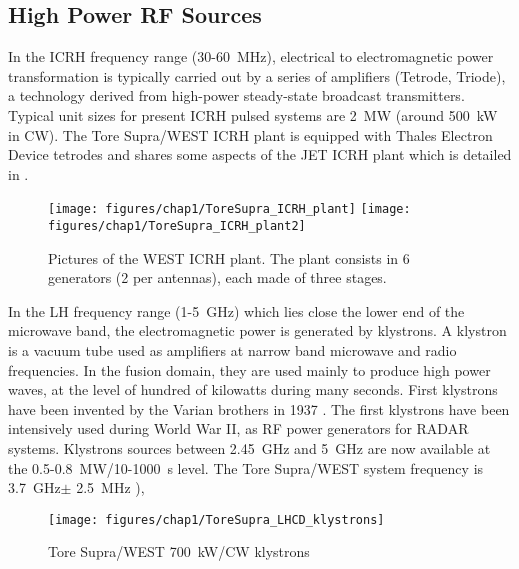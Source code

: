 \subsection{High Power RF Sources}


In the ICRH frequency range (30-60~\si{MHz}), electrical to electromagnetic power transformation is typically carried out by a series of amplifiers (Tetrode, Triode), a technology derived from high-power steady-state broadcast transmitters. Typical unit sizes for present ICRH pulsed systems are 2~\si{MW} (around 500~\si{kW} in CW). The Tore Supra/WEST ICRH plant is equipped with Thales Electron Device tetrodes and shares some aspects of the JET ICRH plant which is detailed in .

\begin{figure}[h]
	\centering
	\texttt{[image: figures/chap1/ToreSupra\_ICRH\_plant]}
	\texttt{[image: figures/chap1/ToreSupra\_ICRH\_plant2]}
	\caption{Pictures of the WEST ICRH plant. The plant consists in 6 generators (2 per antennas), each made of three stages.}
	\label{fig:toresupraicrhplant}
\end{figure}

In the LH frequency range (1-5~\si{GHz}) which lies close the lower end of the microwave band, the electromagnetic power is generated by klystrons. A klystron is a vacuum tube used as amplifiers at narrow band microwave and radio frequencies. In the fusion domain, they are used mainly to produce high power waves, at the level of hundred of kilowatts during many seconds. First klystrons have been invented by the Varian brothers in 1937 . The first klystrons have been intensively used during World War II, as RF power generators for RADAR systems. Klystrons sources between 2.45~\si{GHz} and 5~\si{GHz} are now available at the 0.5-0.8~\si{MW}/10-1000~\si{s} level. The Tore Supra/WEST system frequency is 3.7~\si{GHz}$\pm$ 2.5~\si{MHz} ),

\begin{figure}[h]
	\centering
	\caption{Tore Supra/WEST 700~kW/CW klystrons}
	\texttt{[image: figures/chap1/ToreSupra\_LHCD\_klystrons]}
	\label{fig:toresupralhcdklystrons}
\end{figure}


